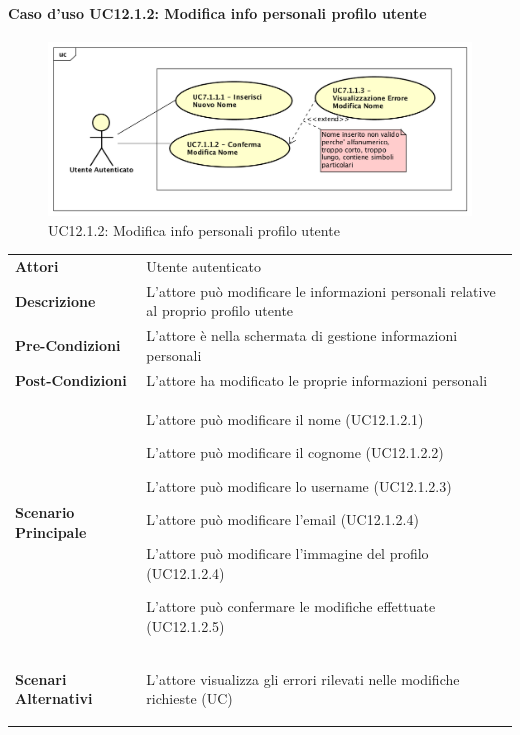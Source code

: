 \paragraph{Caso d'uso UC12.1.2: Modifica info personali profilo utente}
\label{UC12_1_2}
\begin{figure}[ht]
	\centering
	\includegraphics[scale=0.45]{UML/UC7_1_1.png}
	\caption{UC12.1.2: Modifica info personali profilo utente}
\end{figure}
\FloatBarrier
\begin{tabular}{ l | p{11cm}}
	\hline
	\rowcolor{Gray}
	\multicolumn{2}{c}{UC12.1.2 - Modifica info personali profilo utente} \\
	\hline
	\textbf{Attori} & Utente autenticato \\
	\textbf{Descrizione} & L'attore può modificare le informazioni personali relative al proprio profilo utente\\
	\textbf{Pre-Condizioni} & L'attore è nella schermata di gestione informazioni personali\\
	\textbf{Post-Condizioni} & L'attore ha modificato le proprie informazioni personali \\
	\textbf{Scenario Principale} & 
	\begin{enumerate*}[label=(\arabic*.),itemjoin={\newline}]
		\item L'attore può modificare il nome (UC12.1.2.1)
		\item L'attore può modificare il cognome (UC12.1.2.2)
		\item L'attore può modificare lo username (UC12.1.2.3)
		\item L'attore può modificare l'email (UC12.1.2.4)
		\item L'attore può modificare l'immagine del profilo (UC12.1.2.4)
		\item L'attore può confermare le modifiche effettuate (UC12.1.2.5)
	\end{enumerate*}\\
	\textbf{Scenari Alternativi} & 
	\begin{enumerate*}[label=(\arabic*.),itemjoin={\newline}]
		\item L'attore visualizza gli errori rilevati nelle modifiche richieste (UC)
	\end{enumerate*}\\
\end{tabular}

